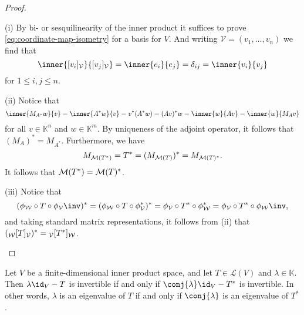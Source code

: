 \documentclass[article, a4paper, 11pt, oneside]{memoir}
\numberwithin{equation}{chapter}
\newcommand{\calL}{\mathcal{L}}
\newcommand{\calV}{\mathcal{V}}
\newcommand{\calW}{\mathcal{W}}
\begin{document}
\begin{proof}
\begin{proofsec}
    \item[(i)]
    By bi- or sesquilinearity of the inner product it suffices to prove \cref{eq:coordinate-map-isometry} for a basis for $V$. And writing $\calV = (v_1, \ldots, v_n)$ we find that
    \begin{equation*}
        \inner{\coordvec{v_i}{\calV}}{\coordvec{v_j}{\calV}}
            = \inner{e_i}{e_j}
            = \delta_{ij}
            = \inner{v_i}{v_j}
    \end{equation*}
    for $1 \leq i,j \leq n$.

    \item[(ii)]
    Notice that
    \begin{equation*}
        \inner{M_{A^*} w}{v}
            = \inner{A^* w}{v}
            = v^* (A^* w)
            = (Av)^* w
            = \inner{w}{Av}
            = \inner{w}{M_A v}
    \end{equation*}
    for all $v \in \mathbb{K}^n$ and $w \in \mathbb{K}^m$. By uniqueness of the adjoint operator, it follows that $(M_A)^* = M_{A^*}$. Furthermore, we have
    \begin{equation*}
        M_{\mathcal{M}(T^*)}
            = T^*
            = (M_{\mathcal{M}(T)})^*
            = M_{\mathcal{M}(T)^*}.
    \end{equation*}
    It follows that $\mathcal{M}(T^*) = \mathcal{M}(T)^*$.

    \item[(iii)]
    Notice that
    \begin{equation*}
        (\coordmap{\calW} \circ T \circ \coordmap{\calV}\inv)^*
            = (\coordmap{\calW} \circ T \circ \coordmap{\calV}^*)^*
            = \coordmap{\calV} \circ T^* \circ \coordmap{\calW}^*
            = \coordmap{\calV} \circ T^* \circ \coordmap{\calW}\inv,
    \end{equation*}
    and taking standard matrix representations, it follows from (ii) that $(\mr{\calW}{T}{\calV})^* = \mr{\calV}{T^*}{\calW}$.
\end{proofsec}
\end{proof}


\begin{proposition}
    Let $V$ be a finite-dimensional inner product space, and let $T \in \calL(V)$ and $\lambda \in \mathbb{K}$. Then $\lambda \id_V - T$ is invertible if and only if $\conj{\lambda} \id_V - T^*$ is invertible. In other words, $\lambda$ is an eigenvalue of $T$ if and only if $\conj{\lambda}$ is an eigenvalue of $T^*$.
\end{proposition}
\end{document}
